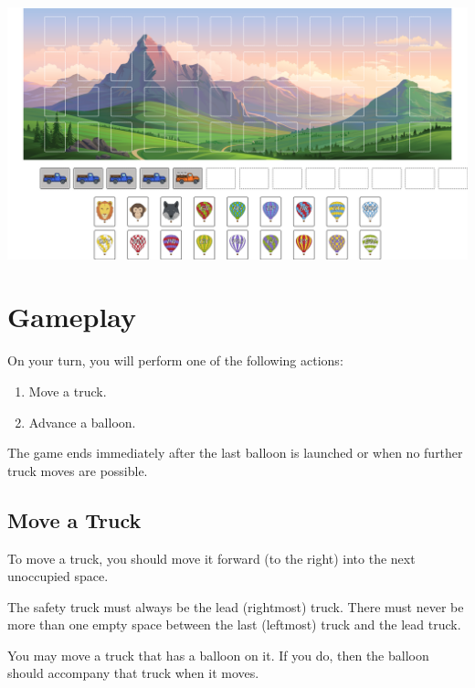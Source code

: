\documentclass[a6paper, 11pt, parskip=half, DIV=15]{scrartcl}
\begin{document}
\begin{center}
\includegraphics[width=\textwidth]{Images/set_up_diagram_revised.png}
\end{center}

\newpage
\enlargethispage{1.75\baselineskip}
\section*{Gameplay}
On your turn, you will perform one of the following actions:
\begin{enumerate}[nosep]
  \item Move a truck.
  \item Advance a balloon.
\end{enumerate}


The game ends immediately after the last balloon is launched or when no further truck moves are possible.


\subsection*{Move a Truck}
To move a truck, you should move it forward (to the right) into the next unoccupied space.

The safety truck must always be the lead (rightmost) truck. There must never be more than one empty space between the last (leftmost) truck and the lead truck.

You may move a truck that has a balloon on it. If you do, then the balloon should accompany that truck when it moves.
\end{document}
